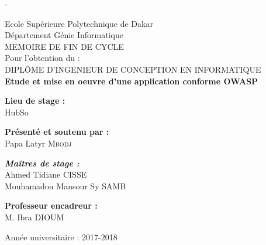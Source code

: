 \begin{titlingpage}
\begin{SingleSpace}
\begin{adjustwidth*}{\unitlength}{-\unitlength}
\begin{center}
				{\large Ecole Supérieure Polytechnique de Dakar }\\
				{\large Département Génie Informatique }\\
				\vspace{12mm}
				{\large MEMOIRE DE FIN DE CYCLE }~\\[0.1cm]
				{\large Pour l'obtention du : }~\\[0.1cm]
				{\large DIPLÔME D'INGENIEUR DE CONCEPTION EN INFORMATIQUE }~\\[0.1cm]
				\vspace{12mm}
				\textbf{\huge Etude et mise en oeuvre d'une application conforme OWASP }\\[4mm]
				\vspace{3mm}
				\hspace{3mm}
				\begin{center}
					{\large \textbf{Lieu de stage :}}\\
					HubSo\\
				\end{center}
				\vspace{3mm}
				\hspace{3mm}
					\begin{flushleft}
						{\large \textbf{Présenté et soutenu par :}}\\
						Papa Latyr \textsc{Mbodj}\\
					\end{flushleft}
				\vspace{3mm}
				\hspace{3mm}
					\begin{center}
						{\large \textbf{\emph{Maîtres de stage :} }}\\
						{\large {Ahmed Tidiane CISSE}}\\
						{\large {Mouhamadou Mansour Sy SAMB}}\\
					\end{center}
				\vspace{3mm}
				\hspace{3mm}
					\begin{flushright}
						{\large \textbf{Professeur encadreur :} }\\
						{\large{M. Ibra DIOUM}}\\
					\end{flushright}
				\vspace{12mm}
				{\large Année universitaire : 2017-2018 }~\\[0.1cm]
			\end{center}
		\end{adjustwidth*}
	\end{SingleSpace}
\end{titlingpage}
\clearpage
